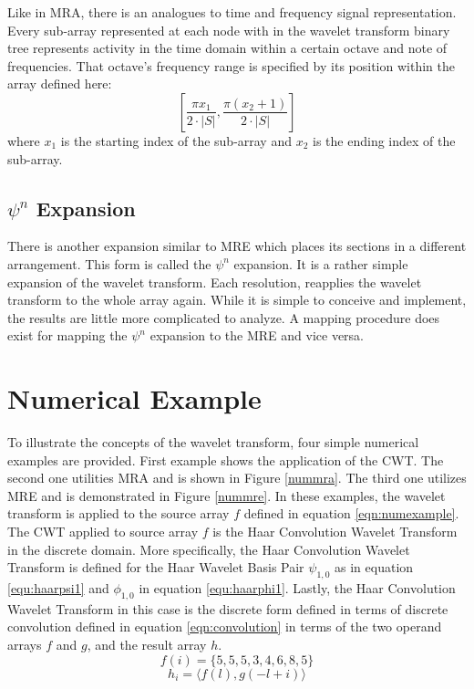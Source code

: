Like in MRA, there is an analogues to time and frequency signal representation.  Every sub-array represented at each node with in the wavelet transform binary tree represents activity in the time domain within a certain octave and note of frequencies.  That octave's frequency range is specified by its position within the array defined here:
\[
\left[
\frac{\pi x_1}{2 \cdot \left|S\right|} , \frac{\pi (x_2+1)}{2 \cdot \left|S\right|} 
\right]
\]
where $x_1$ is the starting index of the sub-array and $x_2$ is the ending index of the sub-array.

\subsection{$\psi^n$ Expansion}

There is another expansion similar to MRE which places its sections in a different arrangement.  This form is called the $\psi^n$ expansion.  It is a rather simple expansion of the wavelet transform.  Each resolution, reapplies the wavelet transform to the whole array again.  While it is simple to conceive and implement, the results are little more complicated to analyze.  A mapping procedure does exist for mapping the $\psi^n$ expansion to the MRE and vice versa.  

\section {Numerical Example}

To illustrate the concepts of the wavelet transform, four simple
numerical examples are provided.  First example shows the application of the CWT.  The second one utilities MRA and is
shown in Figure \ref{nummra}. The third one utilizes MRE and is
demonstrated in Figure \ref{nummre}.   In these examples,  the wavelet transform is applied to the source array $f$ defined in equation \ref{eqn:numexample}.  The CWT applied to source array $f$ is the Haar Convolution Wavelet Transform in the discrete domain.   More specifically, the Haar Convolution Wavelet Transform is defined for the Haar Wavelet Basis Pair  $\psi_{1,0}$ as in equation \ref {equ:haarpsi1} and $\phi_{1,0}$ in equation  \ref{equ:haarphi1}.  Lastly, the Haar Convolution Wavelet Transform in this case is the discrete form defined in terms of discrete convolution defined in equation \ref{eqn:convolution} in terms of the two operand arrays $f$ and $g$, and the result array $h$.
\begin{equation}
\label{eqn:numexample}
f(i) = \{5,5,5,3,4,6,8,5\} 
\end{equation}
\begin{equation}
\label{eqn:convolution}
 h_i = \langle f(l), g(-l + i) \rangle
\end{equation}
